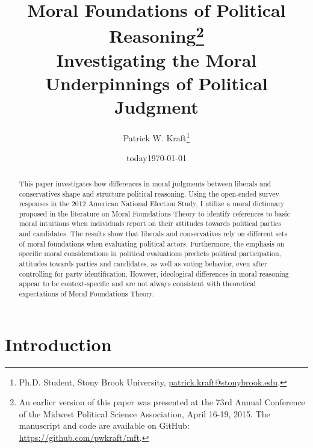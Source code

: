 \documentclass[12pt]{article}
\author{Patrick W. Kraft\footnote{Ph.D. Student, Stony Brook University, \href{mailto:patrick.kraft@stonybrook.edu}{patrick.kraft@stonybrook.edu}.
}}
\date{today}
\title{Moral Foundations of Political Reasoning\footnote{An earlier version of this paper was presented at the 73rd Annual Conference of the Midwest Political Science Association, April 16-19, 2015. The manuscript and code are available on GitHub: \url{https://github.com/pwkraft/mft}.}\\
\large{Investigating the Moral Underpinnings of Political Judgment}}
\date{\today}
\begin{document}
\maketitle
\onehalfspacing

\begin{abstract}
This paper investigates how differences in moral judgments between liberals and conservatives shape and structure political reasoning. Using the open-ended survey responses in the 2012 American National Election Study, I utilize a moral dictionary proposed in the literature on Moral Foundations Theory to identify references to basic moral intuitions when individuals report on their attitudes towards political parties and candidates. The results show that liberals and conservatives rely on different sets of moral foundations when evaluating political actors. Furthermore, the emphasis on specific moral considerations in political evaluations predicts political participation, attitudes towards parties and candidates, as well as voting behavior, even after controlling for party identification. However, ideological differences in moral reasoning appear to be context-specific and are not always consistent with theoretical expectations of Moral Foundations Theory.

\end{abstract}
\newpage


\section{Introduction}
\end{document}

